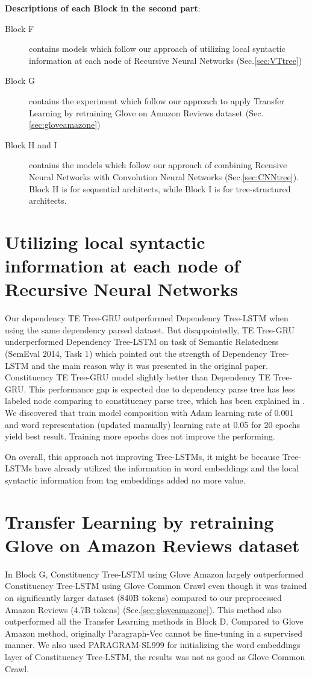 \textbf{Descriptions of each Block in the second part}:
\begin{description}
\item[Block F] contains models which follow our approach of utilizing local syntactic information at each node of Recursive Neural Networks (Sec.\ref{sec:VTtree})
\item[Block G] contains the experiment which follow our approach to apply Transfer Learning by retraining Glove on Amazon Reviews dataset (Sec.\ref{sec:gloveamazone})
\item[Block H and I] contains the models which follow our approach of combining Recusive Neural Networks with Convolution Neural Networks (Sec.\ref{sec:CNNtree}).
Block H is for sequential architects, while Block I is for tree-structured architects.
\end{description} 

\section{Utilizing local syntactic information at each node of Recursive Neural Networks}
Our dependency TE Tree-GRU outperformed Dependency Tree-LSTM when using the same dependency parsed dataset. 
But disappointedly, TE Tree-GRU underperformed Dependency Tree-LSTM on task of Semantic Relatedness (SemEval 2014, Task 1\cite{SemeEvalTask1}) which pointed out the strength of Dependency Tree-LSTM and the main reason why it was presented in the original paper\cite{treeLSTM}.
Constituency TE Tree-GRU model slightly better than Dependency TE Tree-GRU. 
This performance gap is expected due to dependency parse tree has less labeled node comparing to constituency parse tree, which has been explained in  \cite{treeLSTM}. 
We discovered that train model composition with Adam learning rate of 0.001 and word representation (updated manually) learning rate at 0.05 for 20 epochs yield best result. 
Training more epochs does not improve the performing.

On overall, this approach not improving Tree-LSTMs, it might be because Tree-LSTMs have already utilized the information in word embeddings and the local syntactic information from tag embeddings added no more value.

\section{Transfer Learning by retraining Glove on Amazon Reviews dataset}
In Block G, Constituency Tree-LSTM using Glove Amazon largely outperformed Constituency Tree-LSTM using Glove Common Crawl even though it was trained on significantly larger dataset (840B tokens) compared to our preprocessed Amazon Reviews (4.7B tokens) (Sec.\ref{sec:gloveamazone}).
This method also outperformed all the Transfer Learning methods in Block D.
Compared to Glove Amazon method, originally Paragraph-Vec\cite{ParagraphVec} cannot be fine-tuning in a supervised manner.
We also used PARAGRAM-SL999 for initializing the word embeddings layer of Constituency Tree-LSTM, the results was not as good as Glove Common Crawl. 

